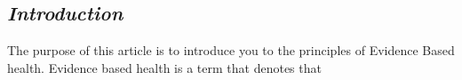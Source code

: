\subsection{\textit{Introduction}}


The purpose of this article is to introduce you to the principles of Evidence Based health. Evidence based health is a term that denotes that 

